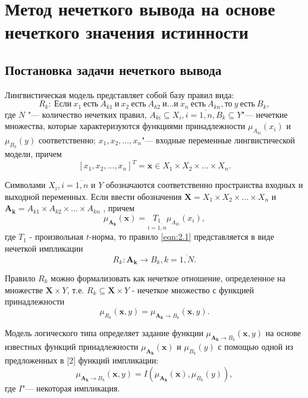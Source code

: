 \chapter{Метод нечеткого вывода на основе нечеткого значения истинности}\label{ch:ch2}

\section{Постановка задачи нечеткого вывода}\label{sec:ch2/fuzzy-inference-problem-statement}

Лингвистическая модель представляет собой базу правил вида:
\begin{equation}
\label{eqn:fuz-problem-1}
R_k:\ \text{Если}\ x_1\ \text{есть}\ A_{k1}\ \text{и}\ x_2\ \text{есть}\ A_{k2}\ \text{и} \dots \text{и}\ x_n\ \text{есть}\ A_{kn}, \text{то}\ y\ \text{есть}\ B_k,
\end{equation}
где $N$ "--- количество нечетких правил, $A_{ki} \subseteq X_i, i=\overline{1,n}, B_k \subseteq Y$"--- нечеткие множества, которые характеризуются функциями принадлежности $\mu_{A_{ki}}(x_i)$ и $\mu_{B_k}(y)$ соответственно; $x_1, x_2,…,x_n$"--- входные переменные лингвистической модели, причем
\[
[x_1, x_2, ..., x_n]^T = \mathbf{x} \in X_1 \times X_2 \times \dots \times X_n.
\]

Символами  $X_i, i=\overline{1,n}$ и $Y$ обозначаются соответственно пространства входных и выходной переменных. Если ввести обозначения $\mathbf{X}=X_1 \times X_2 \times \dots \times X_n$ и $\mathbf{A_k}=A_{k1}\times A_{k2} \times \dots \times A_{kn}$ , причем
\[
\mu_\mathbf{A_k}(\mathbf{x}) = \underset{i=\overline{1,n}}{T_1} \mu_{A_{ki}}(x_i),
\]
где $T_1$ - произвольная $t$-норма, то правило \ref{eqn:2.1} представляется в виде нечеткой импликации
\begin{equation}
\label{eqn:fuz-problem-2}
R_k: \mathbf{A_k} \to B_k, k=\overline{1,N}.
\end{equation}

Правило $R_k$ можно формализовать как нечеткое отношение, определенное на множестве  $\mathbf{X}\times Y$, т.е. $R_k \subseteq \mathbf{X} \times Y$ - нечеткое множество с функцией принадлежности
\[
\mu_{R_k}(\mathbf{x}, y) = \mu_{\mathbf{A_k} \to B_k} (\mathbf{x}, y).
\]

Модель логического типа определяет задание функции $\mu_{\mathbf{A_k} \to B_k} (\mathbf{x}, y)$ на основе известных функций принадлежности $\mu_{\mathbf{A_k}}(\mathbf{x})$ и $\mu_{B_k}(y)$ с помощью одной из предложенных в [2] функций импликации:
\[
\mu_{\mathbf{A_k} \to B_k} (\mathbf{x}, y) = I(\mu_{\mathbf{A_k}}(\mathbf{x}), \mu_{B_k}(y)),
\]
где $I$"--- некоторая импликация.

